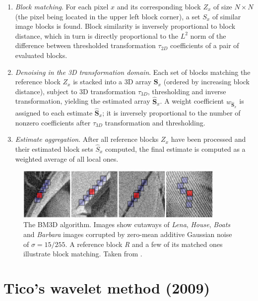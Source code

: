 \documentclass[12pt,notitlepage]{report}
\begin{document}
\begin{enumerate}
	\item {\em Block matching}. For each pixel $x$ and its corresponding block $Z_x$ of size $N \times N$ (the pixel being located in the upper left block corner), a set $S_x$ of similar image blocks is found. Block similarity is inversely proportional to block distance, which in turn is directly proportional to the $L^2$ norm of the difference between thresholded transformation $\tau_{2D}$ coefficients of a pair of evaluated blocks.
	\item {\em Denoising in the 3D transformation domain}. Each set of blocks matching the reference block $Z_x$ is stacked into a 3D array $\mathbf{S}_x$ (ordered by increasing block distance), subject to 3D transformation $\tau_{3D}$, thresholding and inverse transformation, yielding the estimated array $\hat{\mathbf{S}}_x$. A weight coefficient $w_{\hat{\mathbf{S}}_x}$ is assigned to each estimate $\hat{\mathbf{S}}_x$; it is inversely proportional to the number of nonzero coefficients after $\tau_{3D}$ transformation and thresholding.   
	\item {\em Estimate aggregation}. After all reference blocks $Z_x$ have been processed and their estimated block sets $\hat{S}_x$ computed, the final estimate is computed as a weighted average of all local ones.
\end{enumerate}
\begin{figure}[htb]
 \centering
  \includegraphics[width=0.9\textwidth]{bm3d_matching_blocks.png}
 \caption[The BM3D algorithm]{The BM3D algorithm. Images show cutaways of {\em Lena}, {\em House}, {\em Boats} and {\em Barbara} images corrupted by zero-mean additive Gaussian noise of $\sigma = 15/255$. A reference block {\em R} and a few of its matched ones illustrate block matching. Taken from \cite{bm3d}.}
 \label{fig:bm3d_example}
\end{figure}

\clearpage

\section{Tico's wavelet method (2009)}
\label{sec:tico09}
\end{document}

